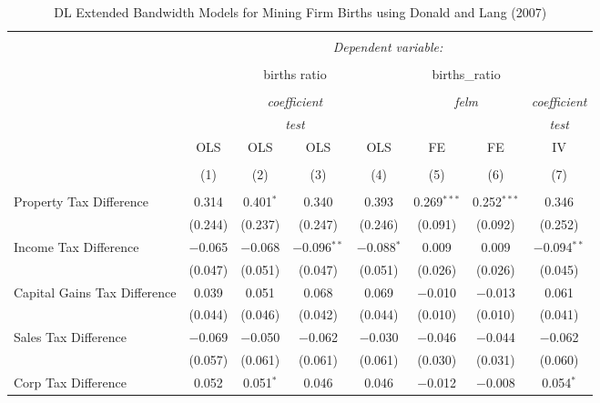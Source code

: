 
\begin{table}[!htbp] \centering 
  \caption{DL Extended Bandwidth Models for  Mining Firm Births using Donald and Lang (2007)} 
  \label{} 
\begin{tabular}{@{\extracolsep{5pt}}lccccccc} 
\\[-1.8ex]\hline 
\hline \\[-1.8ex] 
 & \multicolumn{7}{c}{\textit{Dependent variable:}} \\ 
\cline{2-8} 
\\[-1.8ex] & \multicolumn{4}{c}{births ratio} & \multicolumn{2}{c}{births\_ratio} &   \\ 
\\[-1.8ex] & \multicolumn{4}{c}{\textit{coefficient}} & \multicolumn{2}{c}{\textit{felm}} & \textit{coefficient} \\ 
 & \multicolumn{4}{c}{\textit{test}} & \multicolumn{2}{c}{\textit{}} & \textit{test} \\ 
 & OLS & OLS & OLS & OLS & FE & FE & IV \\ 
\\[-1.8ex] & (1) & (2) & (3) & (4) & (5) & (6) & (7)\\ 
\hline \\[-1.8ex] 
 Property Tax Difference & 0.314 & 0.401$^{*}$ & 0.340 & 0.393 & 0.269$^{***}$ & 0.252$^{***}$ & 0.346 \\ 
  & (0.244) & (0.237) & (0.247) & (0.246) & (0.091) & (0.092) & (0.252) \\ 
  Income Tax Difference & $-$0.065 & $-$0.068 & $-$0.096$^{**}$ & $-$0.088$^{*}$ & 0.009 & 0.009 & $-$0.094$^{**}$ \\ 
  & (0.047) & (0.051) & (0.047) & (0.051) & (0.026) & (0.026) & (0.045) \\ 
  Capital Gains Tax Difference & 0.039 & 0.051 & 0.068 & 0.069 & $-$0.010 & $-$0.013 & 0.061 \\ 
  & (0.044) & (0.046) & (0.042) & (0.044) & (0.010) & (0.010) & (0.041) \\ 
  Sales Tax Difference & $-$0.069 & $-$0.050 & $-$0.062 & $-$0.030 & $-$0.046 & $-$0.044 & $-$0.062 \\ 
  & (0.057) & (0.061) & (0.061) & (0.061) & (0.030) & (0.031) & (0.060) \\ 
  Corp Tax Difference & 0.052 & 0.051$^{*}$ & 0.046 & 0.046 & $-$0.012 & $-$0.008 & 0.054$^{*}$ \\ 

\end{tabular}
\end{table}
